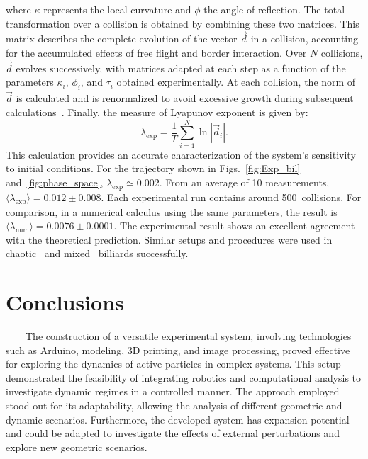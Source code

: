 \documentclass[pdflatex,sn-mathphys-num,iicol]{sn-jnl}%
\newcommand{\av}[1]{\langle #1 \rangle}
\theoremstyle{thmstyleone}%
\theoremstyle{thmstyletwo}%
\theoremstyle{thmstylethree}%
\begin{document}
%
where $\kappa$ represents the local curvature and $\phi$ the angle of reflection. The total transformation over a collision is obtained by combining these two matrices. This matrix describes the complete evolution of the vector $\vec{d}$ in a collision, accounting for the accumulated effects of free flight and border interaction. Over $N$ collisions, $\vec{d}$ evolves successively, with matrices adapted at each step as a function of the parameters $\kappa_i$, $\phi_i$, and $\tau_i$ obtained experimentally. At each collision, the norm of $\vec{d}$ is calculated and is renormalized to avoid excessive growth during subsequent calculations~\cite{ben:1978,pik:2016,vas:2022,qui:2025}. Finally, the measure of Lyapunov exponent is given by:
%
\begin{equation}
\label{eq:lyapexp}
\lambda_\text{exp} = \frac{1}{T} \sum_{i=1}^N \ln \left | \vec{d}_i \right |.
\end{equation}
%
This calculation provides an accurate characterization of the system's sensitivity to initial conditions. For the trajectory shown in Figs.~\ref{fig:Exp_bil} and~\ref{fig:phase_space}, $\lambda_\text{exp} \simeq 0.002$. From an average of 10 measurements, $\av{\lambda_\text{exp}} = 0.012 \pm 0.008$. Each experimental run contains around 500~collisions. For comparison, in a numerical calculus using the same parameters, the result is $\av{\lambda_\text{num}} = 0.0076 \pm 0.0001$. The experimental result shows an excellent agreement with the theoretical prediction. Similar setups and procedures were used in chaotic~\cite{vas:2022} and mixed~\cite{qui:2025} billiards successfully.

\section{Conclusions}
\label{sec:conc}

\ \ \ \ The construction of a versatile experimental system, involving technologies such as Arduino, modeling, 3D printing, and image processing, proved effective for exploring the dynamics of active particles in complex systems. This setup demonstrated the feasibility of integrating robotics and computational analysis to investigate dynamic regimes in a controlled manner. The approach employed stood out for its adaptability, allowing the analysis of different geometric and dynamic scenarios. Furthermore, the developed system has expansion potential and could be adapted to investigate the effects of external perturbations and explore new geometric scenarios.
\end{document}
